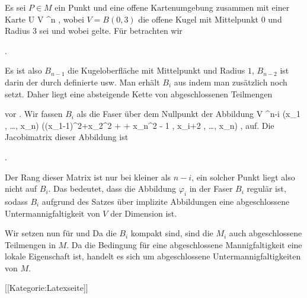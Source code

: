 Es sei $P \in M$ ein Punkt und
 eine offene Kartenumgebung zusammen mit einer Karte
\maabbdisp {\alpha} { U } {V \subseteq \R^n
} {,}
wobei $V=B(0,3)$ die offene Kugel mit Mittelpunkt $0$ und Radius $3$ sei und wobei
 gelte. Für
  betrachten wir

 { . }

Es ist also $B_{n-1}$ die Kugeloberfläche mit Mittelpunkt
 und Radius $1$, $B_{n-2}$ ist darin der durch
 definierte  usw. Man erhält $B_i$ aus
 indem man zusätzlich noch
 setzt. Daher liegt eine absteigende Kette von abgeschlossenen Teilmengen

 {  }
 vor
 {} {.}
Wir fassen $B_i$ als die Faser über dem Nullpunkt der Abbildung
 { V } {\R^{n-i}
} {(x_1 , \ldots , x_n) } {  ((x_1-1)^2+x_2^2 + \cdots + x_n^2 - 1 , x_{i+2} , \ldots , x_n)
} {,}
auf. Die Jacobimatrix dieser Abbildung ist

 { . }

Der Rang dieser Matrix ist nur bei
 kleiner als $n-i$, ein solcher Punkt liegt also nicht auf $B_i$. Das bedeutet, dass die Abbildung $\varphi_i$ in der Faser $B_i$ regulär ist, sodass $B_i$ aufgrund des Satzes über implizite Abbildungen eine abgeschlossene Untermannigfaltigkeit von $V$ der Dimension
 ist.

Wir setzen nun
 für
 und
 Da die $B_i$ kompakt sind, sind die $M_i$ auch abgeschlossene Teilmengen in $M$. Da die Bedingung für eine abgeschlossene Mannigfaltigkeit eine lokale Eigenschaft ist, handelt es sich um abgeschlossene Untermannigfaltigkeiten von $M$.

 [[Kategorie:Latexseite]]
